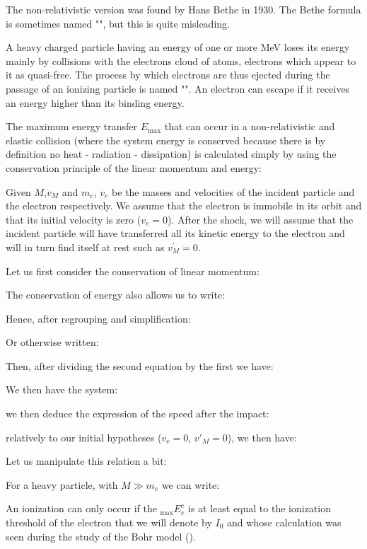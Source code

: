 	The non-relativistic version was found by Hans Bethe in 1930. The Bethe formula is sometimes named "", but this is quite misleading.
	
	A heavy charged particle having an energy of one or more MeV loses its energy mainly by collisions with the electrons cloud of atoms, electrons which appear to it as quasi-free. The process by which electrons are thus ejected during the passage of an ionizing particle is named "". An electron can escape if it receives an energy higher than its binding energy.

	The maximum energy transfer $E_{\max}$ that can occur in a non-relativistic and elastic collision (where the system energy is conserved because there is by definition no heat - radiation - dissipation) is calculated simply by using the conservation principle of the linear momentum and energy:

	Given $M$,$v_M$ and $m_e$, $v_e$ be the masses and velocities of the incident particle and the electron respectively. We assume that the electron is immobile in its orbit and that its initial velocity is zero ($v_e=0$). After the shock, we will assume that the incident particle will have transferred all its kinetic energy to the electron and will in turn find itself at rest such as $v_M^{\prime}=0$.
	
	Let us first consider the conservation of linear momentum:
	
	The conservation of energy also allows us to write:
	
	Hence, after regrouping and simplification:
	
	Or otherwise written:
	
	Then, after dividing the second equation by the first we have:
	
	We then have the system:
	
	we then deduce the expression of the speed after the impact:
	
	relatively to our initial hypotheses ($v_e=0$, $v'_M=0$), we then have:
	
	Let us manipulate this relation a bit:
	
	For a heavy particle, with $M\gg m_e$ we can write:
	
	An ionization can only occur if the $_\text{max}E^e_c$ is at least equal to the ionization threshold of the electron that we will denote by $I_0$ and whose calculation was seen during the study of the Bohr model ().

